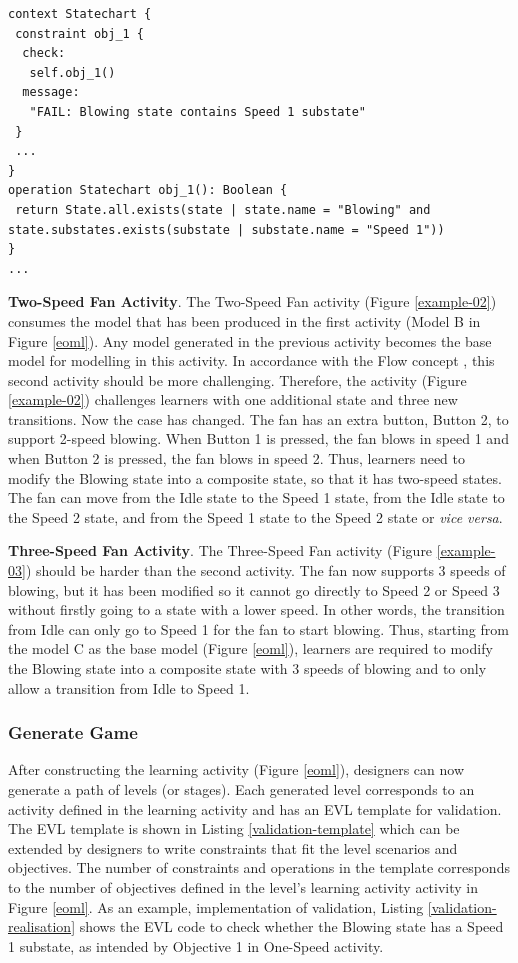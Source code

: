 \documentclass[12pt, a4paper]{report} \usepackage[titletoc]{appendix}
\begin{document}
\begin{lstlisting}[style=interfaces,caption={Validation realisation for Objective 1 in One-Speed Fan activity/level.}, label=validation-realisation]
context Statechart {
 constraint obj_1 {
  check: 
   self.obj_1()
  message:
   "FAIL: Blowing state contains Speed 1 substate"
 }
 ...
}
operation Statechart obj_1(): Boolean {
 return State.all.exists(state | state.name = "Blowing" and state.substates.exists(substate | substate.name = "Speed 1"))
}
...
\end{lstlisting} 

\textbf{Two-Speed Fan Activity}. The Two-Speed Fan activity (Figure \ref{example-02}) consumes the model that has been produced in the first activity (Model B in Figure \ref{eoml}). Any model generated in the previous activity becomes the base model for modelling in this activity. In accordance with the Flow concept \cite{csikszentmihalyi2014toward}, this second activity should be more challenging. Therefore, the activity (Figure \ref{example-02}) challenges learners with one additional state and three new transitions. Now the case has changed. The fan has an extra button, Button 2, to support 2-speed blowing. When Button 1 is pressed, the fan blows in speed 1 and when Button 2 is pressed, the fan blows in speed 2. Thus, learners need to modify the Blowing state into a composite state, so that it has two-speed states. The fan can move from the Idle state to the Speed 1 state, from the Idle state to the Speed 2 state, and from the Speed 1 state to the Speed 2 state or \textit{vice versa}.

\textbf{Three-Speed Fan Activity}. The Three-Speed Fan activity (Figure \ref{example-03}) should be harder than the second activity. The fan now supports 3 speeds of blowing, but it has been modified so it cannot go directly to Speed 2 or Speed 3 without firstly going to a state with a lower speed. In other words, the transition from Idle can only go to Speed 1 for the fan to start blowing. Thus, starting from the model C as the base model (Figure \ref{eoml}), learners are required to modify the Blowing state into a composite state with 3 speeds of blowing and to only allow a transition from Idle to Speed 1.

\subsubsection{Generate Game}
After constructing the learning activity (Figure \ref{eoml}), designers can now generate a path of levels (or stages). Each generated level corresponds to an activity defined in the learning activity and has an EVL template for validation. The EVL template is shown in Listing \ref{validation-template} which can be extended by designers to write constraints that fit the level scenarios and objectives. The number of constraints and operations in the template corresponds to the number of objectives defined in the level's learning activity activity in Figure \ref{eoml}. As an example, implementation of validation, Listing \ref{validation-realisation} shows the EVL code to check whether the Blowing state has a Speed 1 substate, as intended by Objective 1 in One-Speed activity. 
\end{document}

